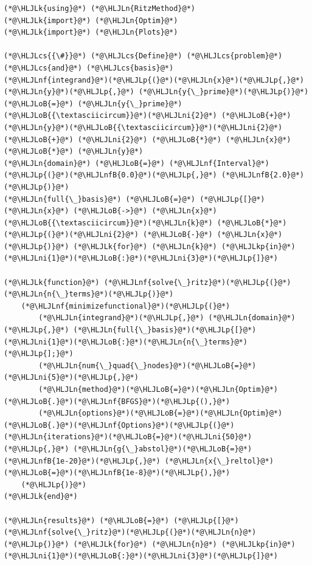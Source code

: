 \documentclass[12pt,a4paper]{article}
\newcommand{\HLJLk}[1]{\textcolor[RGB]{148,91,176}{\textbf{#1}}}
\newcommand{\HLJLkp}[1]{\textcolor[RGB]{148,91,176}{\textbf{#1}}}
\newcommand{\HLJLn}[1]{#1}
\newcommand{\HLJLnf}[1]{\textcolor[RGB]{66,102,213}{#1}}
\newcommand{\HLJLnfB}[1]{\textcolor[RGB]{59,151,46}{#1}}
\newcommand{\HLJLni}[1]{\textcolor[RGB]{59,151,46}{#1}}
\newcommand{\HLJLoB}[1]{\textcolor[RGB]{102,102,102}{\textbf{#1}}}
\newcommand{\HLJLp}[1]{#1}
\newcommand{\HLJLcs}[1]{\textcolor[RGB]{153,153,119}{\textit{#1}}}
\begin{document}
\begin{lstlisting}
(*@\HLJLk{using}@*) (*@\HLJLn{RitzMethod}@*)
(*@\HLJLk{import}@*) (*@\HLJLn{Optim}@*)
(*@\HLJLk{import}@*) (*@\HLJLn{Plots}@*)

(*@\HLJLcs{{\#}}@*) (*@\HLJLcs{Define}@*) (*@\HLJLcs{problem}@*) (*@\HLJLcs{and}@*) (*@\HLJLcs{basis}@*)
(*@\HLJLnf{integrand}@*)(*@\HLJLp{(}@*)(*@\HLJLn{x}@*)(*@\HLJLp{,}@*) (*@\HLJLn{y}@*)(*@\HLJLp{,}@*) (*@\HLJLn{y{\_}prime}@*)(*@\HLJLp{)}@*) (*@\HLJLoB{=}@*) (*@\HLJLn{y{\_}prime}@*)(*@\HLJLoB{{\textasciicircum}}@*)(*@\HLJLni{2}@*) (*@\HLJLoB{+}@*) (*@\HLJLn{y}@*)(*@\HLJLoB{{\textasciicircum}}@*)(*@\HLJLni{2}@*) (*@\HLJLoB{+}@*) (*@\HLJLni{2}@*) (*@\HLJLoB{*}@*) (*@\HLJLn{x}@*) (*@\HLJLoB{*}@*) (*@\HLJLn{y}@*)
(*@\HLJLn{domain}@*) (*@\HLJLoB{=}@*) (*@\HLJLnf{Interval}@*)(*@\HLJLp{(}@*)(*@\HLJLnfB{0.0}@*)(*@\HLJLp{,}@*) (*@\HLJLnfB{2.0}@*)(*@\HLJLp{)}@*)
(*@\HLJLn{full{\_}basis}@*) (*@\HLJLoB{=}@*) (*@\HLJLp{[}@*)(*@\HLJLn{x}@*) (*@\HLJLoB{->}@*) (*@\HLJLn{x}@*)(*@\HLJLoB{{\textasciicircum}}@*)(*@\HLJLn{k}@*) (*@\HLJLoB{*}@*) (*@\HLJLp{(}@*)(*@\HLJLni{2}@*) (*@\HLJLoB{-}@*) (*@\HLJLn{x}@*)(*@\HLJLp{)}@*) (*@\HLJLk{for}@*) (*@\HLJLn{k}@*) (*@\HLJLkp{in}@*) (*@\HLJLni{1}@*)(*@\HLJLoB{:}@*)(*@\HLJLni{3}@*)(*@\HLJLp{]}@*)

(*@\HLJLk{function}@*) (*@\HLJLnf{solve{\_}ritz}@*)(*@\HLJLp{(}@*)(*@\HLJLn{n{\_}terms}@*)(*@\HLJLp{)}@*)
    (*@\HLJLnf{minimizefunctional}@*)(*@\HLJLp{(}@*)
        (*@\HLJLn{integrand}@*)(*@\HLJLp{,}@*) (*@\HLJLn{domain}@*)(*@\HLJLp{,}@*) (*@\HLJLn{full{\_}basis}@*)(*@\HLJLp{[}@*)(*@\HLJLni{1}@*)(*@\HLJLoB{:}@*)(*@\HLJLn{n{\_}terms}@*)(*@\HLJLp{];}@*)
        (*@\HLJLn{num{\_}quad{\_}nodes}@*)(*@\HLJLoB{=}@*)(*@\HLJLni{5}@*)(*@\HLJLp{,}@*)
        (*@\HLJLn{method}@*)(*@\HLJLoB{=}@*)(*@\HLJLn{Optim}@*)(*@\HLJLoB{.}@*)(*@\HLJLnf{BFGS}@*)(*@\HLJLp{(),}@*)
        (*@\HLJLn{options}@*)(*@\HLJLoB{=}@*)(*@\HLJLn{Optim}@*)(*@\HLJLoB{.}@*)(*@\HLJLnf{Options}@*)(*@\HLJLp{(}@*)(*@\HLJLn{iterations}@*)(*@\HLJLoB{=}@*)(*@\HLJLni{50}@*)(*@\HLJLp{,}@*) (*@\HLJLn{g{\_}abstol}@*)(*@\HLJLoB{=}@*)(*@\HLJLnfB{1e-20}@*)(*@\HLJLp{,}@*) (*@\HLJLn{x{\_}reltol}@*)(*@\HLJLoB{=}@*)(*@\HLJLnfB{1e-8}@*)(*@\HLJLp{),}@*)
    (*@\HLJLp{)}@*)
(*@\HLJLk{end}@*)

(*@\HLJLn{results}@*) (*@\HLJLoB{=}@*) (*@\HLJLp{[}@*)(*@\HLJLnf{solve{\_}ritz}@*)(*@\HLJLp{(}@*)(*@\HLJLn{n}@*)(*@\HLJLp{)}@*) (*@\HLJLk{for}@*) (*@\HLJLn{n}@*) (*@\HLJLkp{in}@*) (*@\HLJLni{1}@*)(*@\HLJLoB{:}@*)(*@\HLJLni{3}@*)(*@\HLJLp{]}@*)
\end{lstlisting}
\end{document}
